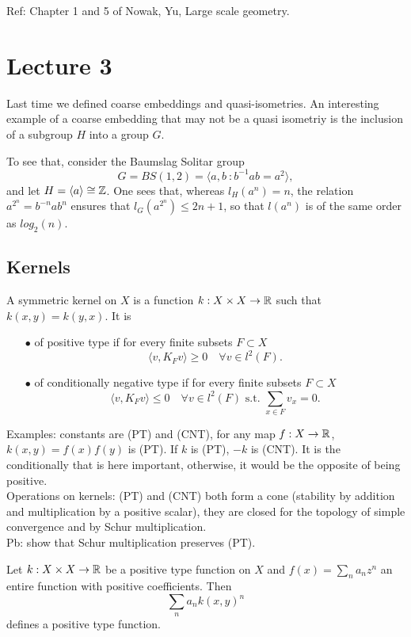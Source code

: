 Ref: Chapter 1 and 5 of Nowak, Yu, Large scale geometry.

\section{Lecture 3}

Last time we defined coarse embeddings and quasi-isometries. An interesting example of a coarse embedding that may not be a quasi isometriy is the inclusion of a subgroup $H$ into a group $G$.

To see that, consider the Baumslag Solitar group 
\[G =BS(1,2) = \langle a, b \  : b^{-1}ab = a^2 \rangle ,\]
and let $H = \langle a \rangle \cong \mathbb Z$. One sees that, whereas $l_H(a^n) = n$, the relation $a^{2^n} = b^{-n}a b^n$ ensures that $l_G(a^{2^n}) \leq 2n+ 1$, so that $l(a^n)$ is of the same order as $log_2(n)$. 

\subsection{Kernels}

A symmetric kernel on $X$ is a function $k: X\times X \rightarrow \mathbb R $ such that $k(x,y) = k(y,x)$. It is
\begin{itemize}
\item[$\bullet$] of positive type if for every finite subsets $F \subset X$
\[\langle v , K_F v \rangle \geq 0 \quad \forall v \in l^2(F).\] 
\item[$\bullet$] of conditionally negative type if for every finite subsets $F \subset X$
\[\langle v , K_F v \rangle \leq 0 \quad \forall v \in l^2(F)\text{ s.t. }\sum_{x\in F} v_x = 0.\] 
\end{itemize}

Examples: constants are (PT) and (CNT), for any map $f : X\rightarrow \mathbb R$, $k(x,y) =f(x)f(y)$ is (PT). If $k$ is (PT), $-k$ is (CNT). It is the conditionally that is here important, otherwise, it would be the opposite of being positive.\\

Operations on kernels: (PT) and (CNT) both form a cone (stability by addition and multiplication by a positive scalar), they are closed for the topology of simple convergence and by Schur multiplication. \\

Pb: show that Schur multiplication preserves (PT).\\

\begin{prop}
Let $k: X\times X\rightarrow \mathbb R $ be a positive type function on $X$ and $f(x)=\sum_n a_n z^n$ an entire function with positive coefficients. Then
\[\sum_n a_n k(x,y)^n\]
defines a positive type function. 
\end{prop}

